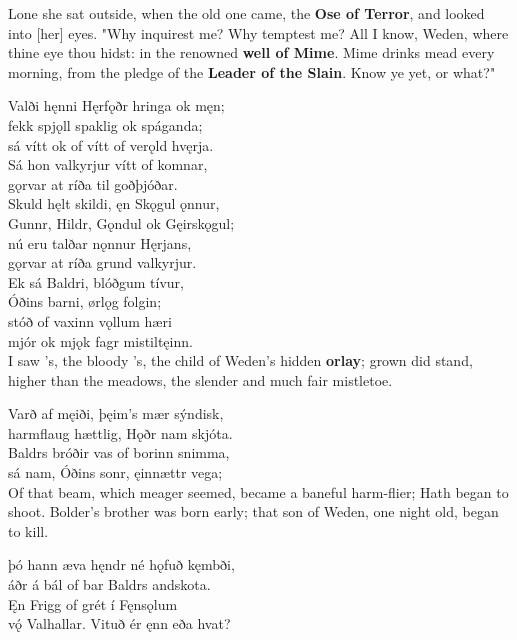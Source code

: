 \bvb Lone she sat outside, when the old one came, the \textbf{Ose of Terror}, and looked into [her] eyes. "Why inquirest me? Why temptest me? All I know, Weden, where thine eye thou hidst: in the renowned \textbf{well of Mime}. Mime drinks mead every morning, from the pledge of the \textbf{Leader of the Slain}. Know ye yet, or what?"

\bva Valði hęnni Hęrfǫðr \hld hringa ok męn; \\%
fekk spjǫll spaklig \hld ok spáganda; \\%
sá vítt ok of vítt \hld of verǫld hvęrja.\\%

\bva Sá hon valkyrjur \hld vítt of komnar, \\%
gǫrvar at ríða \hld til goðþjóðar. \\%
Skuld hęlt skildi, \hld ęn Skǫgul ǫnnur, \\%
Gunnr, Hildr, Gǫndul \hld ok Gęirskǫgul; \\%
nú eru talðar \hld nǫnnur Hęrjans, \\%
gǫrvar at ríða \hld grund valkyrjur.\\%

\bva Ek sá Baldri, \hld blóðgum tívur, \\%
Óðins barni, \hld ørlǫg folgin; \\%
stóð of vaxinn \hld vǫllum hæri \\%
mjór ok mjǫk fagr \hld mistiltęinn.\\%

\bvb I saw 's, the bloody ’s, the child of Weden’s hidden \textbf{orlay}; grown did stand, higher than the meadows, the slender and much fair mistletoe.

\bva Varð af męiði, \hld þęim's mær sýndisk, \\%
harmflaug hættlig, \hld Hǫðr nam skjóta. \\%
Baldrs bróðir vas \hld of borinn snimma, \\%
sá nam, Óðins sonr, \hld ęinnættr vega;\\%

\bvb Of that beam, which meager seemed, became a baneful harm-flier; Hath began to shoot. Bolder's brother was born early; that son of Weden, one night old, began to kill.

\bva þó hann æva hęndr \hld né hǫfuð kęmbði, \\%
áðr á bál of bar \hld Baldrs andskota. \\%
Ęn Frigg of grét \hld í Fęnsǫlum \\%
vǫ́ Valhallar. \hld Vituð ér ęnn eða hvat?\\%

